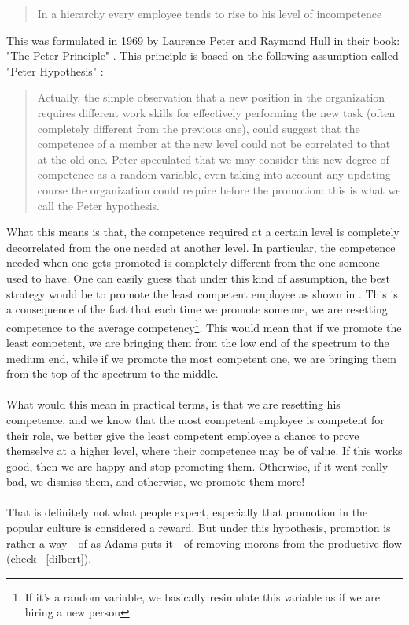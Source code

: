 \documentclass[11pt]{article}
\begin{document}
\begin{quote}
In a hierarchy every employee tends to rise to his level of incompetence
\end{quote}

This was formulated in 1969 by Laurence Peter and Raymond Hull in their book: "The Peter Principle" \cite{peter}. This principle is based on the following assumption called "Peter Hypothesis" \cite{petercomp}:

\begin{quote}
Actually, the simple observation that a new position in the organization requires different work skills for effectively performing the new task (often completely different from the previous one), could suggest that the competence of a member at the new level could not be correlated to that at the old one. Peter speculated that we may consider this new degree of competence as a random variable, even taking into account any updating course the organization could require before the promotion: this is what we call the Peter hypothesis.
\end{quote}

What this means is that, the competence required at a certain level is completely decorrelated from the one needed at another level. In particular, the competence needed when one gets promoted is completely different from the one someone used to have. One can easily guess that under this kind of assumption, the best strategy would be to promote the least competent employee as shown in \cite{petercomp}. This is a consequence of the fact that each time we promote someone, we are resetting competence to the average competency\footnote{If it's a random variable, we basically resimulate this variable as if we are hiring a new person}. This would mean that if we promote the least competent, we are bringing them from the low end of the spectrum to the medium end, while if we promote the most competent one, we are bringing them from the top of the spectrum to the middle.\\
\\
What would this mean in practical terms, is that we are resetting his competence, and we know that the most competent employee is competent for their role, we better give the least competent employee a chance to prove themselve at a higher level, where their competence may be of value. If this works good, then we are happy and stop promoting them. Otherwise, if it went really bad, we dismiss them, and otherwise, we promote them more!\\
\\
That is definitely not what people expect, especially that promotion in the popular culture is considered a reward. But under this hypothesis, promotion is rather a way - of as Adams puts it - of removing morons from the productive flow (check ~\ref{dilbert}).
\end{document}
